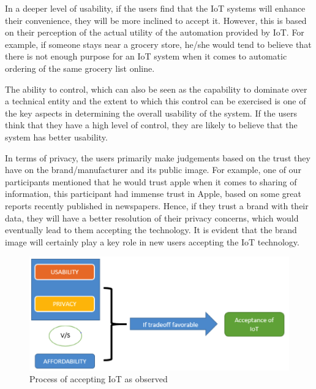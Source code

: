 In a deeper level of usability, if the users find that the IoT systems will enhance their convenience, they will be more inclined to accept it. However, this is based on their perception of the actual utility of the automation provided by IoT. For example, if someone stays near a grocery store, he/she would tend to believe that there is not enough purpose for an IoT system when it comes to automatic ordering of the same grocery list online. 

The ability to control, which can also be seen as the capability to dominate over a technical entity and the extent to which this control can be exercised is one of the key aspects in determining the overall usability of the system. If the users think that they have a high level of control, they are likely to believe that the system has better usability.

In terms of privacy, the users primarily make judgements based on the trust they have on the brand/manufacturer and its public image. For example, one of our participants mentioned that he would trust apple when it comes to sharing of information, this participant had immense trust in Apple, based on some great reports recently published in newspapers. Hence, if they trust a brand with their data, they will have a better resolution of their privacy concerns, which would eventually lead to them accepting the technology. It is evident that the brand image will certainly play a key role in new users accepting the IoT technology.


\begin{figure}
	\centering
	\includegraphics[width=0.6\columnwidth]{figures/AcceptingProcess.png}
	\caption{Process of accepting IoT as observed}
	\label{fig:AcceptingProcess}
\end{figure}

